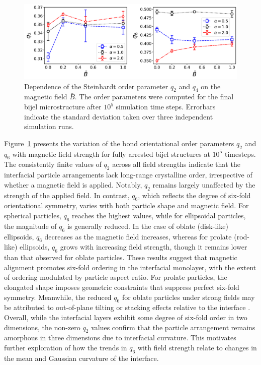 \begin{figure}
\includegraphics[width=\textwidth]{../figures/results/paper1_5/steinhardt_field.png}%
\caption{Dependence of the Steinhardt order parameter $q_2$ and $q_4$ on the magnetic field $\bar{B}$. The order parameters were computed for the final 
         bijel microstructure after $10^5$ simulation time steps. Errorbars indicate the standard deviation taken over three independent simulation runs.
\label{fig:steinhardt_field}}%
\end{figure}

Figure~\ref{fig:steinhardt_field} presents the variation of the bond orientational order parameters \(q_2\) and \(q_6\) with magnetic field strength for fully arrested bijel structures at \(10^5\) 
timesteps. The consistently finite values of \(q_2\) across all field strengths indicate that the interfacial particle arrangements lack long-range crystalline order, irrespective of whether a magnetic 
field is applied. Notably, \(q_2\) remains largely unaffected by the strength of the applied field. In contrast, \(q_6\), which reflects the degree of six-fold orientational symmetry, varies with both 
particle shape and magnetic field. For spherical particles, \(q_6\) reaches the highest values, while for ellipsoidal particles, the magnitude of \(q_6\) is generally reduced. In the case of oblate 
(disk-like) ellipsoids, \(q_6\) decreases as the magnetic field increases, whereas for prolate (rod-like) ellipsoids, \(q_6\) grows with increasing field strength, though it remains lower than that 
observed for oblate particles. These results suggest that magnetic alignment promotes six-fold ordering in the interfacial monolayer, with the extent of ordering modulated by particle aspect ratio. 
For prolate particles, the elongated shape imposes geometric constraints that suppress perfect six-fold symmetry. Meanwhile, the reduced \(q_6\) for oblate particles under strong fields may be attributed 
to out-of-plane tilting or stacking effects relative to the interface \cite{dabat_mesoscale_2018}. Overall, while the interfacial layers exhibit some degree of six-fold order in two dimensions, the 
non-zero \(q_2\) values confirm that the particle arrangement remains amorphous in three dimensions due to interfacial curvature. This motivates further exploration of how the trends in \(q_6\) with 
field strength relate to changes in the mean and Gaussian curvature of the interface.

